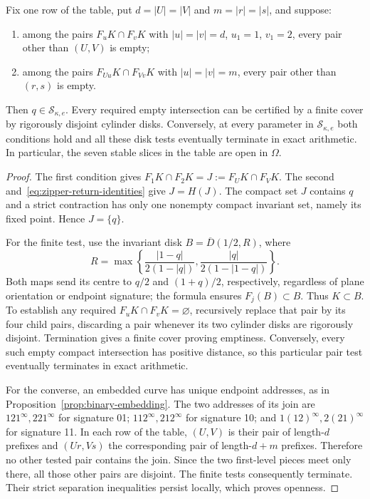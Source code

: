 \begin{proposition}
\label{prop:zipper-return-certificate}
Fix one row of the table, put $d=|U|=|V|$ and $m=|r|=|s|$, and suppose:
\begin{enumerate}
\item among the pairs $F_uK\cap F_vK$ with $|u|=|v|=d$, $u_1=1$,
      $v_1=2$, every pair other than $(U,V)$ is empty;
\item among the pairs $F_{Uu}K\cap F_{Vv}K$ with $|u|=|v|=m$,
      every pair other than $(r,s)$ is empty.
\end{enumerate}
Then $q\in\mathcal S_{\kappa,e}$. Every required empty intersection can
be certified by a finite cover by rigorously disjoint cylinder disks.
Conversely, at every parameter in $\mathcal S_{\kappa,e}$ both conditions
hold and all these disk tests eventually terminate in exact arithmetic.
In particular, the
seven stable slices in the table are open in $\Omega$.
\end{proposition}
\begin{proof}
The first condition gives $F_1K\cap F_2K=J:=F_UK\cap F_VK$.
The second and~\eqref{eq:zipper-return-identities} give $J=H(J)$.
The compact set $J$ contains $q$ and a strict contraction has only one
nonempty compact invariant set, namely its fixed point. Hence $J=\{q\}$.

For the finite test, use the invariant disk $B=\overline D(1/2,R)$, where
\[
 R=\max\left\{\frac{|1-q|}{2(1-|q|)},
                 \frac{|q|}{2(1-|1-q|)}\right\}.
\]
Both maps send its centre to $q/2$ and $(1+q)/2$, respectively, regardless
of plane orientation or endpoint signature; the formula ensures
$F_j(B)\subset B$. Thus $K\subset B$. To establish any required
$F_uK\cap F_vK=\varnothing$, recursively replace that pair by its four
child pairs, discarding a pair whenever its two cylinder disks are
rigorously disjoint. Termination gives a finite cover proving emptiness.
Conversely, every such empty compact intersection has positive distance,
so this particular pair test eventually terminates in exact arithmetic.

For the converse, an embedded curve has unique endpoint addresses, as in
Proposition~\ref{prop:binary-embedding}. The two addresses of its join are
$121^\infty,221^\infty$ for signature 01;
$112^\infty,212^\infty$ for signature 10; and
$1(12)^\infty,2(21)^\infty$ for signature 11. In each row of the table,
$(U,V)$ is their pair of length-$d$ prefixes and $(Ur,Vs)$ the corresponding
pair of length-$d+m$ prefixes. Therefore no other tested pair contains
the join. Since the two first-level pieces meet only there, all those
other pairs are disjoint. The finite tests consequently terminate.
Their strict separation inequalities persist locally, which proves
openness.
\end{proof}

